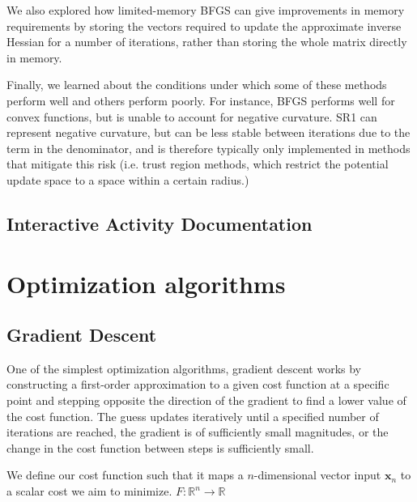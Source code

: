 \documentclass[12pt]{article}
\begin{document}
We also explored how limited-memory BFGS can give improvements in memory requirements by storing the vectors required to update 
the approximate inverse Hessian for a number of iterations, rather than storing the whole matrix directly in memory.

Finally, we learned about the conditions under which some of these methods perform well and others perform poorly.
For instance, BFGS performs well for convex functions, but is unable to account for negative curvature. SR1 can represent 
negative curvature, but can be less stable between iterations due to the term in the denominator, and is therefore typically 
only implemented in methods that mitigate this risk (i.e. trust region methods, which restrict the potential update space to 
a space within a certain radius.)

\subsection{Interactive Activity Documentation}

\section{Optimization algorithms}

\subsection{Gradient Descent}
One of the simplest optimization algorithms, gradient descent works by constructing a first-order
approximation to a given cost function at a specific point and stepping opposite the direction of the 
gradient to find a lower value of the cost function. The guess updates iteratively until a specified number of
iterations are reached, the gradient is of sufficiently small magnitudes, or the change in the cost function
between steps is sufficiently small. 

We define our cost function such that it maps a \(n\)-dimensional vector input \(\mathbf{x}_n\)
to a scalar cost we aim to minimize. \(F : \mathbb{R}^n \to \mathbb{R}\)
\end{document}
